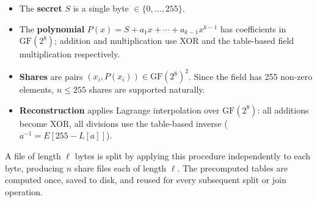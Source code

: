 \documentclass[12pt]{article}
\theoremstyle{definition}
\theoremstyle{plain}
\begin{document}
	\begin{itemize}
		\item The \textbf{secret} $S$ is a single byte $\in \{0,\dots,255\}$.
		\item The \textbf{polynomial} $P(x) = S + a_1 x + \cdots + a_{k-1}x^{k-1}$
		has coefficients in $\mathrm{GF}(2^8)$; addition and multiplication
		use XOR and the table-based field multiplication respectively.
		\item \textbf{Shares} are pairs $(x_i, P(x_i)) \in \mathrm{GF}(2^8)^2$.
		Since the field has 255 non-zero elements, $n \le 255$ shares are
		supported naturally.
		\item \textbf{Reconstruction} applies Lagrange interpolation over
		$\mathrm{GF}(2^8)$: all additions become XOR, all divisions use the
		table-based inverse ($a^{-1} = E[255 - L[a]]$).
	\end{itemize}
	
	A file of length $\ell$ bytes is split by applying this procedure
	independently to each byte, producing $n$ share files each of length $\ell$.
	The precomputed tables are computed once, saved to disk, and reused for
	every subsequent split or join operation.
	
\end{document}
